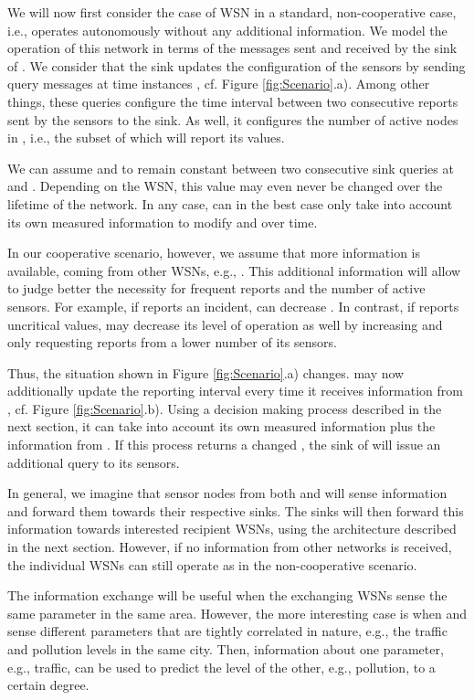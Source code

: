 \documentclass[onecolumn]{jaise2e}
\begin{document}
We will now first consider the case of WSN  in a standard, non-cooperative case, i.e.,  operates autonomously without any additional information. We model the operation of this network in terms of the messages sent and received by the sink of . We consider that the sink updates the configuration of the sensors  by sending query messages at time instances , cf. Figure \ref{fig:Scenario}.a). Among other things, these queries configure the time interval  between two consecutive reports sent by the sensors to the sink. As well, it configures the number of active nodes  in , i.e., the subset of  which will report its values.


We can assume  and  to remain constant between two consecutive sink queries at  and . Depending on the WSN, this value may even never be changed over the lifetime of the network. In any case,  can in the best case only take into account its own measured information to modify  and  over time.

In our cooperative scenario, however, we assume that more information is available, coming from other WSNs, e.g., . This additional information will allow to judge better the necessity for frequent reports and the number of active sensors. For example, if  reports an incident,  can decrease . In contrast, if  reports uncritical values,  may decrease its level of operation as well by increasing  and only requesting reports from a lower number  of its sensors.

Thus, the situation shown in Figure \ref{fig:Scenario}.a) changes.  may now additionally update the reporting interval every time it receives information from , cf. Figure \ref{fig:Scenario}.b). Using a decision making process described in the next section, it can take into account its own measured information plus the information from . If this process returns a changed , the sink of  will issue an additional query to its sensors.

In general, we imagine that sensor nodes from both  and  will sense information and forward them towards their respective sinks. The sinks will then forward this information towards interested recipient WSNs, using the architecture described in the next section. However, if no information from other networks is received, the individual WSNs can still operate as in the non-cooperative scenario.

The information exchange will be useful when the exchanging WSNs sense the same parameter in the same area. However, the more interesting case is when  and  sense different parameters that are tightly correlated in nature, e.g., the traffic and pollution levels in the same city. Then, information about one parameter, e.g., traffic, can be used to predict the level of the other, e.g., pollution, to a certain degree.
 
\end{document}
